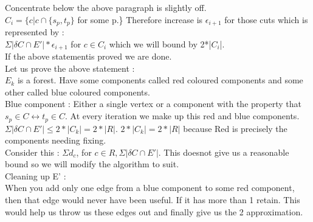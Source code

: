 \documentclass[solution,addpoints,12pt]{exam}
\begin{document}
Concentrate below the above paragraph is slightly off.\\

$C_i = \{c | c \cap \{s_p, t_p\}$ for  some p.\}
Therefore increase is $\epsilon_{i+1}$ for those cuts which is represented by :\\
$\Sigma |\delta C \cap E'|*\epsilon_{i+1}$ for $c \in C_i$ which we will bound
by 2*|$C_i$|.\\
If the above statementis proved we are done.\\

Let us prove the above statement :\\
$E_k$ is a forest. Have some components called red coloured
components and some other called blue coloured components.\\
Blue component : Either a single vertex or a component with the property that
$s_p \in C \leftrightarrow t_p \in C$. At every iteration
we make up this red and blue components.\\
$\Sigma |\delta C \cap E'| \le 2*|C_k| = 2*|R|$. $2*|C_k| = 2*|R|$
because Red is precisely the components needing fixing.\\

Consider this : $\Sigma d_c$, for $c \in R, \Sigma |\delta C \cap E'|$.
This doesnot give us a reasonable bound so we will modify the algorithm
to suit.\\
Cleaning up E' :\\
When you add only one edge from a blue component to some red
component, then that edge would never have been useful. If it
has more than 1 retain. This would help us throw us these edges out
and finally give us the 2 approximation.\\
\end{document}
